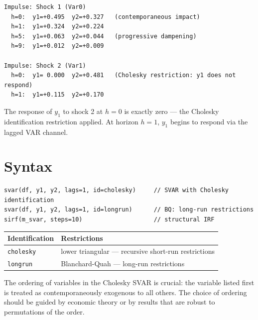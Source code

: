 \begin{lstlisting}[language={}, basicstyle=\ttfamily\small,
  frame=none, numbers=none, backgroundcolor=\color{codbg},
  xleftmargin=0pt, xrightmargin=0pt, breaklines=false]
Impulse: Shock 1 (Var0)
  h=0:  y1=+0.495  y2=+0.327   (contemporaneous impact)
  h=1:  y1=+0.324  y2=+0.224
  h=5:  y1=+0.063  y2=+0.044   (progressive dampening)
  h=9:  y1=+0.012  y2=+0.009

Impulse: Shock 2 (Var1)
  h=0:  y1= 0.000  y2=+0.481   (Cholesky restriction: y1 does not respond)
  h=1:  y1=+0.115  y2=+0.170
\end{lstlisting}

The response of $y_1$ to shock 2 at $h=0$ is exactly zero — the Cholesky
identification restriction applied. At horizon $h=1$, $y_1$ begins to respond
via the lagged VAR channel.

\section{Syntax}

\begin{lstlisting}
svar(df, y1, y2, lags=1, id=cholesky)     // SVAR with Cholesky identification
svar(df, y1, y2, lags=1, id=longrun)      // BQ: long-run restrictions
sirf(m_svar, steps=10)                    // structural IRF
\end{lstlisting}

\begin{center}
\begin{tabular}{ll}
\toprule
\textbf{Identification} & \textbf{Restrictions} \\
\midrule
\texttt{cholesky} & lower triangular — recursive short-run restrictions \\
\texttt{longrun}  & Blanchard-Quah — long-run restrictions \\
\bottomrule
\end{tabular}
\end{center}

\begin{nota}
  The ordering of variables in the Cholesky SVAR is crucial: the variable listed
  first is treated as contemporaneously exogenous to all others.
  The choice of ordering should be guided by economic theory or by
  results that are robust to permutations of the order.
\end{nota}
